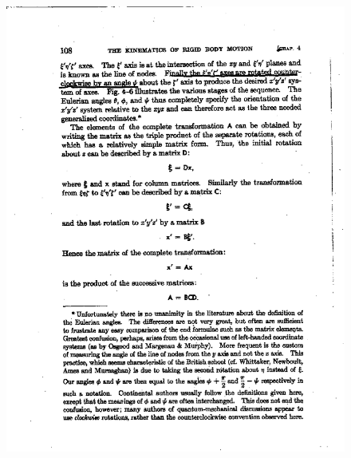 \documentclass[11pt,preprint]{aastex}
\begin{document}
\begin{figure}
\includegraphics[width=7.0in] {page108.ps}
\end{figure}  
\end{document}
